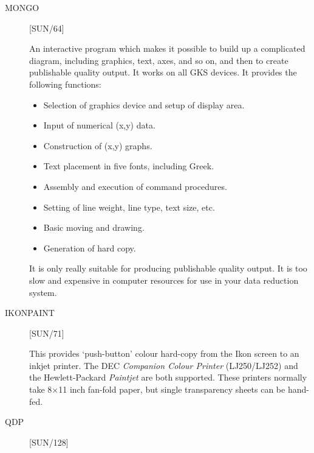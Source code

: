 \begin{description}

\item [MONGO] \hfill [SUN/64]

An interactive program which makes it possible to build up a complicated
diagram, including graphics, text, axes, and so on, and then to create
publishable quality output.
It works on all GKS devices.
It provides the following functions:
\begin{itemize}
\item Selection of graphics device and setup of display area.
\item Input of numerical (x,y) data.
\item Construction of (x,y) graphs.
\item Text placement in five fonts, including Greek.
\item Assembly and execution of command procedures.
\item Setting of line weight, line type, text size, etc.
\item Basic moving and drawing.
\item Generation of hard copy.
\end{itemize}
It is only really suitable for producing publishable quality output.
It is too slow and expensive in computer resources for use in your data
reduction system.

\item [IKONPAINT] \hfill [SUN/71]

This provides `push-button' colour hard-copy from the Ikon screen to an
inkjet printer.
The DEC {\it Companion Colour Printer} (LJ250/LJ252) and the Hewlett-Packard
{\it Paintjet} are both supported.
These printers normally take 8$\times$11 inch fan-fold paper, but single
transparency sheets can be hand-fed.

\item [QDP] \hfill [SUN/128]


\end{description}
